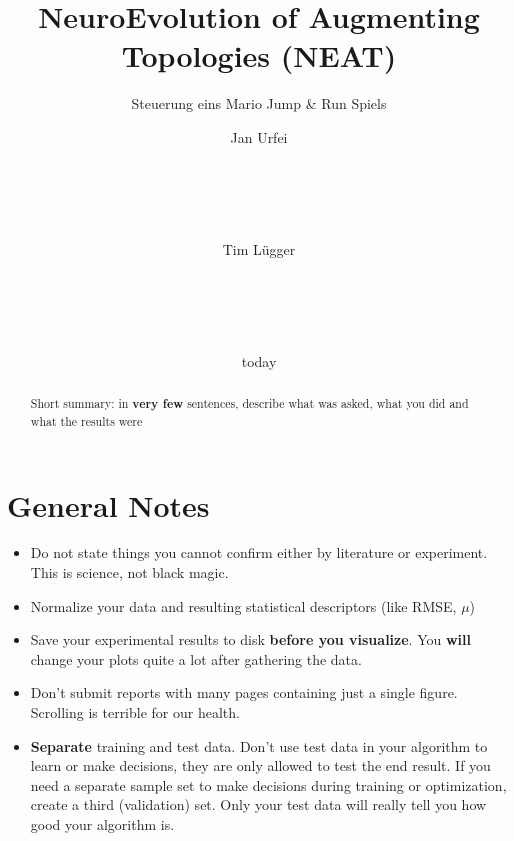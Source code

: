 \documentclass{hbrs-ecta-report}
\begin{document}

\title{NeuroEvolution of Augmenting Topologies (NEAT)}
\subtitle{Steuerung eins Mario Jump \& Run Spiels}

\author{
Jan Urfei\\
       \\
       \\
       \\
       \\
\and
	Tim Lügger\\
	\\
	\\
	\\
	\\
}
\date{today}
\maketitle
\begin{abstract}
Short summary: in \textbf{very few} sentences, describe what was asked, what you did and what the results were
\end{abstract}

\section{General Notes}
\label{sec:generalnotes}
\begin{itemize}
\item Do not state things you cannot confirm either by literature or experiment. This is science, not black magic.
\item Normalize your data and resulting statistical descriptors (like RMSE, $\mu$)
\item Save your experimental results to disk \textbf{before you visualize}. You \textbf{will} change your plots quite a lot after gathering the data.
\item Don't submit reports with many pages containing just a single figure. Scrolling is terrible for our health.
\item \textbf{Separate} training and test data. Don't use test data in your algorithm to learn or make decisions, they are only allowed to test the end result. If you need a separate sample set to make decisions during training or optimization, create a third (validation) set. Only your test data will really tell you how good your algorithm is. 
\end{itemize}
\end{document}
